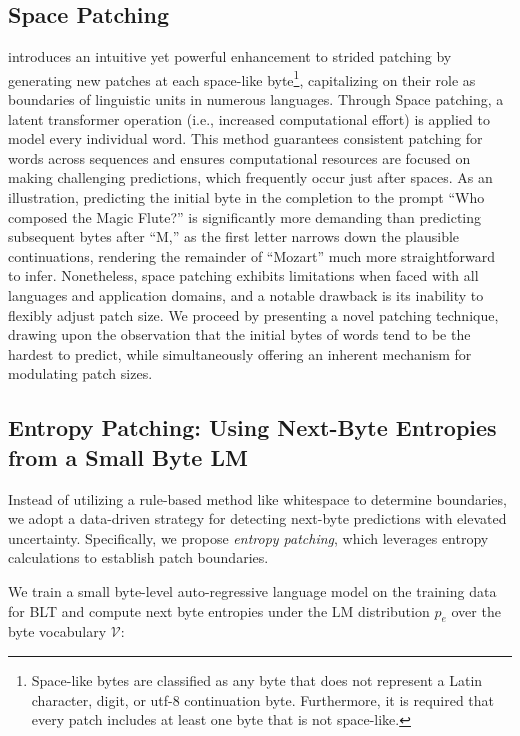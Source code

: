 \subsection{Space Patching}
\label{section:white-patch}

\citet{slagle2024spacebyte} introduces an intuitive yet powerful enhancement to strided patching by generating new patches at each space-like byte\footnote{
    Space-like bytes are classified as any byte that does not represent a Latin character, digit, or utf-8 continuation byte. Furthermore, it is required that every patch includes at least one byte that is not space-like. }, capitalizing on their role as boundaries of linguistic units in numerous languages. Through Space patching, a latent transformer operation (i.e., increased computational effort) is applied to model every individual word. This method guarantees consistent patching for words across sequences and ensures computational resources are focused on making challenging predictions, which frequently occur just after spaces. As an illustration, predicting the initial byte in the completion to the prompt “Who composed the Magic Flute?\uline{\hspace{.6em}}” is significantly more demanding than predicting subsequent bytes after ``M,'' as the first letter narrows down the plausible continuations, rendering the remainder of ``Mozart'' much more straightforward to infer. Nonetheless, space patching exhibits limitations when faced with all languages and application domains, and a notable drawback is its inability to flexibly adjust patch size. We proceed by presenting a novel patching technique, drawing upon the observation that the initial bytes of words tend to be the hardest to predict, while simultaneously offering an inherent mechanism for modulating patch sizes.

\subsection{Entropy Patching: Using Next-Byte Entropies from a Small Byte LM}
\label{section:dyn-patch}

Instead of utilizing a rule-based method like whitespace to determine boundaries, we adopt a data-driven strategy for detecting next-byte predictions with elevated uncertainty. Specifically, we propose \textit{entropy patching}, which leverages entropy calculations to establish patch boundaries.

We train a small byte-level auto-regressive language model on the training data for {\textsc BLT} and compute next byte entropies under the LM distribution $p_{e}$ over the byte vocabulary $\mathcal{V}$:

